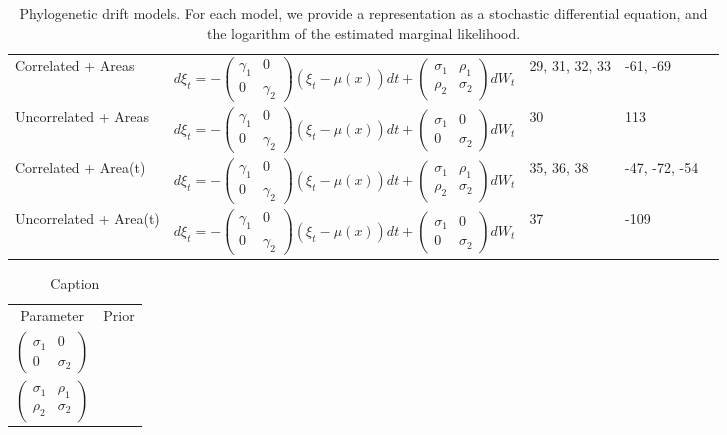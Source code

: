 \documentclass[11pt,a4paper]{article}
\begin{document}
\begin{table}
\begin{tabular}{lllll}
\hline
Correlated  + Areas & $d\xi_t = - \left(\begin{matrix} \gamma_1 & 0 \\ 0 & \gamma_2\end{matrix}\right) \left(\xi_t-\mu(x)\right) dt + \left(\begin{matrix} \sigma_1 & \rho_1 \\ \rho_2 & \sigma_2\end{matrix}\right) dW_t$ & 29, 31, 32, 33 & -61, -69\\
Uncorrelated  + Areas & $d\xi_t = - \left(\begin{matrix} \gamma_1 & 0 \\ 0 & \gamma_2\end{matrix}\right) \left(\xi_t-\mu(x)\right) dt + \left(\begin{matrix} \sigma_1 & 0 \\ 0 & \sigma_2\end{matrix}\right) dW_t$ & 30 & 113\\
\hline
Correlated  + Area(t) & $d\xi_t = - \left(\begin{matrix} \gamma_1 & 0 \\ 0 & \gamma_2\end{matrix}\right) \left(\xi_t-\mu(x)\right) dt + \left(\begin{matrix} \sigma_1 & \rho_1 \\ \rho_2 & \sigma_2\end{matrix}\right) dW_t$ & 35, 36, 38 & -47, -72, -54\\
Uncorrelated  + Area(t) & $d\xi_t = - \left(\begin{matrix} \gamma_1 & 0 \\ 0 & \gamma_2\end{matrix}\right) \left(\xi_t-\mu(x)\right) dt + \left(\begin{matrix} \sigma_1 & 0 \\ 0 & \sigma_2\end{matrix}\right) dW_t$ & 37 & -109\\
\hline
\end{tabular}
\caption{Phylogenetic drift models. For each model, we provide a representation as a stochastic differential equation, and the logarithm of the estimated marginal likelihood.}
\end{table}

\begin{table}[]
    \centering
    \begin{tabular}{c|c}
   Parameter & Prior \\ 
  $\left(\begin{matrix} \sigma_1 & 0 \\ 0 & \sigma_2\end{matrix}\right)$       &  \\
         $\left(\begin{matrix} \sigma_1 & \rho_1 \\ \rho_2 & \sigma_2\end{matrix}\right)$ & 
    \end{tabular}
    \caption{Caption}
    \label{tab:my_label}
\end{table}
\end{document}
